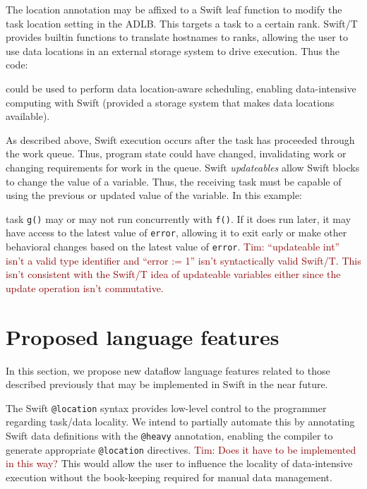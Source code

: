 \documentclass[conference,10pt]{IEEEtran}
\newcommand{\arm}[1]{ {\textcolor{darkred} { Tim: #1 }}}
\newcommand{\arm}[1]{}
\begin{document}
The location annotation may be affixed to a Swift leaf function to
modify the task location setting in the ADLB.  This targets
a task to a certain rank.  Swift/T provides builtin functions to
translate hostnames to ranks, allowing the user to use data locations
in an external storage system to drive execution.  Thus the code: 

could be used to perform data location-aware scheduling, enabling
data-intensive computing with Swift (provided a storage system that makes
data locations available).

As described above, Swift execution occurs after the task has
proceeded through the work queue.  Thus, program state could have
changed, invalidating work or changing requirements for work in the queue.
Swift \emph{updateables} allow Swift blocks to change the value of a
variable.  Thus, the receiving task
must be capable of using the previous or updated value of the
variable. In this example: 

task {\tt g()} may or may not run concurrently with {\tt f()}.  If it
does run later, it may have access to the latest value of {\tt error},
allowing it to exit early or make other behavioral changes based on
the latest value of \texttt{error}. 
\arm{``updateable int'' isn't a valid type identifier and ``error := 1''
    isn't syntactically valid Swift/T.  This isn't consistent with the
    Swift/T idea of updateable variables either since the update operation
    isn't commutative.}

\section{Proposed language features}
\label{section:proposed}

In this section, we propose new dataflow language features related to
those described previously that may be implemented in Swift in the
near future. 

 The Swift \texttt{@location} syntax provides low-level control to the
programmer regarding task/data locality.  We intend to partially
automate this by annotating Swift data definitions with the
\texttt{@heavy} annotation, enabling the compiler to generate
appropriate \texttt{@location} directives.  \arm{Does it have
to be implemented in this way?} This would allow the user
to influence the locality of data-intensive execution without the
book-keeping required for manual data management. 
\end{document}
